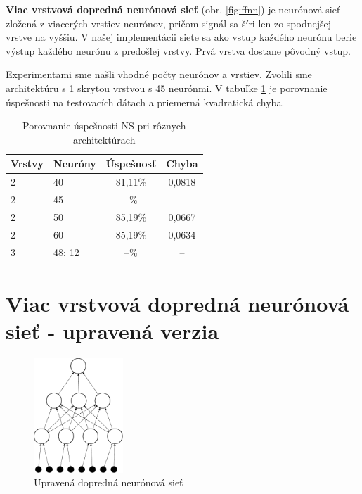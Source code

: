 \textbf{Viac vrstvová dopredná neurónová sieť} (obr. \ref{fig:ffnn}) je neurónová sieť zložená z viacerých vrstiev neurónov, pričom signál sa šíri len zo spodnejšej vrstve na vyššiu. V našej implementácii siete sa ako vstup každého neurónu berie výstup každého neurónu z predošlej vrstvy. Prvá vrstva dostane pôvodný vstup. 

Experimentami sme našli vhodné počty neurónov a vrstiev. Zvolili sme architektúru s 1 skrytou vrstvou s 45 neurónmi. V tabuľke \ref{tab:neuroncountcmp} je porovnanie úspešnosti na testovacích dátach a priemerná kvadratická chyba.

\begin{table}[hp]
\centering
\begin{tabular}{|l|l|c|c|}
\hline
\textbf{Vrstvy} & \textbf{Neuróny} & \textbf{Úspešnosť} & \textbf{Chyba}\\ \hline
2 & 40 & 81,11\% & 0,0818\\ \hline
2 & 45 & --\% & --\\ \hline
2 & 50 & 85,19\% & 0,0667\\ \hline
2 & 60 & 85,19\% & 0,0634\\ \hline
3 & 48; 12 & --\% & --\\
\hline
\end{tabular}
\caption{Porovnanie úspešnosti NS pri rôznych architektúrach}
\label{tab:neuroncountcmp}
\end{table}


\section{Viac vrstvová dopredná neurónová sieť - upravená verzia}

\begin{figure}[hp]
  \begin{center}
    \includegraphics[width=0.3\textwidth]{images/dffnn}
  \end{center}
  \caption{Upravená dopredná neurónová sieť}
  \label{fig:dffnn}
\end{figure}


